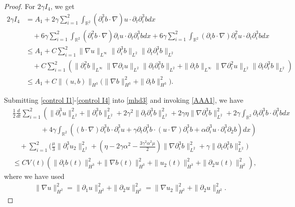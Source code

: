 \documentclass[reqno,11pt]{amsart}
\def\R{\mathbb R}
\numberwithin{Thm}{section}
\begin{document}
\begin{proof}
\par For $2\gamma I_4$, we get
 \begin{align}
2\gamma I_4&=
A_{1}+2\gamma\sum_{i=1}^2\int_{\R^2}(\partial_i^3b\cdot\nabla) u\cdot\partial_t\partial_i^3 bdx\nonumber\\
&\quad+6\gamma\sum_{i=1}^2\int_{\R^2}(\partial_i^2b\cdot\nabla)\partial_i u\cdot\partial_t\partial_i^3 bdx+6\gamma\sum_{i=1}^2\int_{\R^2}(\partial_i b\cdot\nabla)\partial_i^2 u\cdot\partial_t\partial_i^3 bdx\nonumber\\ &\leq
A_1+C\sum_{i=1}^2
\|\nabla u\|_{L^{\infty}}\|\partial_i^3 b\|_{L^2}\|\partial_t\partial_i^3b\|_{L^2}\nonumber\\
&\quad
+C\sum_{i=1}^2(\|\partial_i^2 b\|_{L^{\infty}}\|\nabla\partial_iu\|_{L^2}\|\partial_t\partial_i^3b\|_{L^2}+\|\partial_i b\|_{L^{\infty}}\|\nabla\partial_i^2u\|_{L^2}\|\partial_t\partial_i^3b\|_{L^2})\nonumber\\
&\leq A_1+C\|(u,b)\|_{H^3}\big(\|\nabla b\|_{H^3}^2+\|\partial_{t}b\|_{H^3}^2\big).\label{control I4}
\end{align}
\par




Submitting \eqref{control I1}-\eqref{control I4} into \eqref{mhd3} and invoking \eqref{AAA1}, we have
\begin{align}\label{mhd32}
&\frac{1}{2}\frac{d}{dt}\sum_{i=1}^2\left(\|\partial_i^3 u\|^2_{L^2}+\|\partial_i^3 b\|^2_{L^2}+2\gamma^2\|\partial_t\partial_i^3b\|^2_{L^2}
+2\gamma\eta\|\nabla\partial_i^3 b\|^2_{L^2}+2\gamma\int_{\R^2}\partial_t\partial_i^3b\cdot\partial_i^3bdx\right.\nonumber\\
&\left.\qquad\qquad+4\gamma\int_{\R^2}\left((b\cdot\nabla)\partial_i^3 b\cdot\partial_i^3 u+\gamma\partial_{t}\partial_i^3b\cdot (u\cdot\nabla)\partial_i^3 b+\alpha\partial_i^3u\cdot\partial_i^3\partial_2 b\right)dx\right)\nonumber\\
&\quad+\sum_{i=1}^2\bigg(\frac{\mu}{3}\|\partial_i^3u_2\|^2_{L^2}+(\eta-2\gamma\alpha^2-\frac{3\gamma^2\alpha^2\mu}{2})\|\nabla \partial_i^3b\|^2_{L^2}+\gamma\|\partial_{t}\partial_i^3b\|^2_{L^2}\bigg)\nonumber\\
&\leq CV(t)\left(\|\partial_{t} b(t)\|_{H^3}^2+\|\nabla b(t)\|_{H^3}^2+\|u_2(t)\|_{H^3}^2+\|\partial_{2}u(t)\|_{H^2}^2\right),
\end{align}
where we have used \begin{align*}\|\nabla u\|_{H^2}^2=\|\partial_1 u\|_{H^2}^2+\|\partial_2 u\|_{H^2}^2=\| \nabla u_2\|_{H^2}^2+\|\partial_2 u\|_{H^2}^2.\end{align*}


\end{proof}
\end{document}
